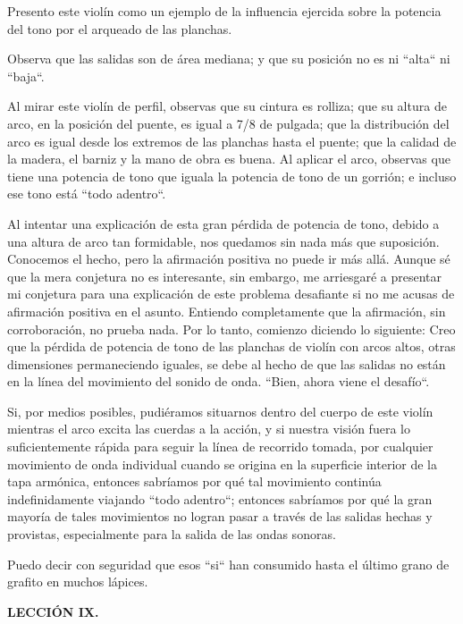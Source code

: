 \documentclass[12pt]{book}
\begin{document}
Presento este violín como un ejemplo de la influencia ejercida sobre la potencia del tono por el arqueado de las planchas.

Observa que las salidas son de área mediana; y que su posición no es ni ``alta`` ni ``baja``.

Al mirar este violín de perfil, observas que su cintura es rolliza; que su altura de arco, en la posición del puente, es igual a 7/8 de pulgada; que la distribución del arco es igual desde los extremos de las planchas hasta el puente; que la calidad de la madera, el barniz y la mano de obra es buena. Al aplicar el arco, observas que tiene una potencia de tono que iguala la potencia de tono de un gorrión; e incluso ese tono está ``todo adentro``.

Al intentar una explicación de esta gran pérdida de potencia de tono, debido a una altura de arco tan formidable, nos quedamos sin nada más que suposición. Conocemos el hecho, pero la afirmación positiva no puede ir más allá. Aunque sé que la mera conjetura no es interesante, sin embargo, me arriesgaré a presentar mi conjetura para una explicación de este problema desafiante si no me acusas de afirmación positiva en el asunto. Entiendo completamente que la afirmación, sin corroboración, no prueba nada. Por lo tanto, comienzo diciendo lo siguiente: Creo que la pérdida de potencia de tono de las planchas de violín con arcos altos, otras dimensiones permaneciendo iguales, se debe al hecho de que las salidas no están en la línea del movimiento del sonido de onda. ``Bien, ahora viene el desafío``.

Si, por medios posibles, pudiéramos situarnos dentro del cuerpo de este violín mientras el arco excita las cuerdas a la acción, y si nuestra visión fuera lo suficientemente rápida para seguir la línea de recorrido tomada, por cualquier movimiento de onda individual cuando se origina en la superficie interior de la tapa armónica, entonces sabríamos por qué tal movimiento continúa indefinidamente viajando ``todo adentro``; entonces sabríamos por qué la gran mayoría de tales movimientos no logran pasar a través de las salidas hechas y provistas, especialmente para la salida de las ondas sonoras.

Puedo decir con seguridad que esos ``si`` han consumido hasta el último grano de grafito en muchos lápices.

\textbf{LECCIÓN IX.}
\end{document}
